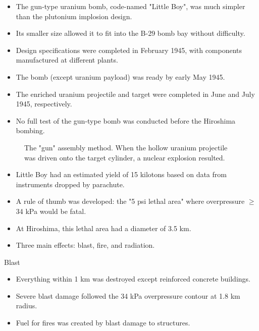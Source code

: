 \documentclass{loyola-beamer}
\begin{document}
\begin{frame}
	\begin{itemize}
		\item The gun-type uranium bomb, code-named "Little Boy", was much simpler than the plutonium implosion design.
		\item Its smaller size allowed it to fit into the B-29 bomb bay without difficulty.
		\item Design specifications were completed in February 1945, with components manufactured at different plants.
		\item The bomb (except uranium payload) was ready by early May 1945.
		\item The enriched uranium projectile and target were completed in June and July 1945, respectively.
		\item No full test of the gun-type bomb was conducted before the Hiroshima bombing.
	\end{itemize}
\end{frame}

\begin{frame}
	\begin{figure}
		\begin{center}
			
		\end{center}
		\caption{The "gun" assembly method. When the hollow uranium projectile was driven onto the target cylinder, a nuclear explosion resulted.}
	\end{figure}
\end{frame}

\begin{frame}
	\begin{itemize}
		\item Little Boy had an estimated yield of 15 kilotons based on data from instruments dropped by parachute.
		\item A rule of thumb was developed: the "5 psi lethal area" where overpressure $\geq$ 34 kPa would be fatal.
		\item At Hiroshima, this lethal area had a diameter of 3.5 km.
		\item Three main effects: blast, fire, and radiation.
	\end{itemize}
\end{frame}

\begin{frame}{Blast}
	\begin{itemize}
		\item Everything within 1 km was destroyed except reinforced concrete buildings.
		\item Severe blast damage followed the 34 kPa overpressure contour at 1.8 km radius.
		\item Fuel for fires was created by blast damage to structures.
	\end{itemize}
\end{frame}
\end{document}
